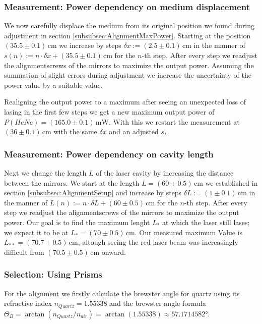 \documentclass[../../main.tex]{subfiles}
\begin{document}
    \subsubsection{Measurement: Power dependency on medium displacement}\label{subsubsec:MeasurementPowerdependencyOnDisplacement}
        We now carefully displace the medium from its original position we found during adjustment in section \ref{subsubsec:AlignmentMaxPower}. Starting at the position $(35.5\pm 0.1)\,\si{\cm}$ we increase by steps $\delta x := (2.5\pm 0.1)\,\si{\cm}$ in the manner of $s(n):=n\cdot \delta x + (35.5\pm 0.1)\,\si{\cm}$ for the $n$-th step. After every step we readjust the alignmentscrews of the mirrors to maximize the output power. Assuming the summation of slight errors during adjustment we increase the uncertainty of the power value by a suitable value. 

        Realigning the output power to a maximum after seeing an unexpected loss of lasing in the first few steps we get a new maximum output power of $P(HeNe) = (165.0\pm 0.1)\,\si{\mW}$. With this we restart the measurement at $(36\pm 0.1)\,\si{\cm}$ with the same $\delta x$ and an adjusted $s_*$.

    \subsubsection{Measurement: Power dependency on cavity length}
        Next we change the length $L$ of the laser cavity by increasing the distance between the mirrors. We start at the length $L = (60\pm 0.5)\,\si{\cm}$ we established in section \ref{subsubsec:AlignmentSetup} and increase by steps $\delta L := (1\pm 0.1)\,\si{\cm}$ in the manner of $L(n):=n\cdot \delta L + (60\pm 0.5)\,\si{\cm}$ for the $n$-th step. After every step we readjust the alignmentscrews of the mirrors to maximize the output power. Our goal is to find the maximum lenght $L_*$ at which the laser still lases; we expect it to be at $L_* = (70\pm 0.5)\,\si{\cm}$. Our measured maximum Value is $L_{**} = (70.7\pm 0.5)\,\si{\cm}$, altough seeing the red laser beam was increasingly difficult from $(70.5\pm 0.5)\,\si{\cm}$ onward. 

    \subsubsection{Selection: Using Prisms}
        For the alignment we firstly calculate the brewster angle for quartz using its refractive index $n_{\textit{Quartz}} = 1.55338$ and the brewster angle formula $\Theta_{B} = \arctan(n_{\textit{Quartz}}/n_{\textit{air}}) = \arctan(1.55338) \approx 57.1714582\si{\degree}$.
\end{document}
